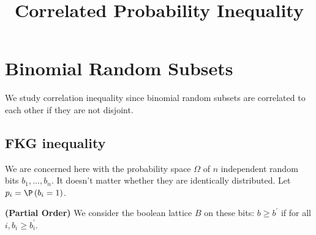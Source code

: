 \documentclass{article}
\title{Correlated Probability Inequality}
\newcommand{\bfs}[1]{\textbf{({#1})}}
\begin{document}
\maketitle



\section{Binomial Random Subsets}
We study correlation inequality since binomial random subsets are correlated to each other if they are not disjoint.
\subsection{FKG inequality}
We are concerned here with the probability space $\Omega$ of $n$ independent random  bits $b_{1}, \ldots, b_{n} .$ It doesn't matter whether they are identically distributed. Let $p_{i}=\P\left(b_{i}=1\right)$. 
\begin{defa}{\bfs{Partial Order}}\label{defa:po}
We consider the boolean lattice $B$ on these bits: $b \geq b^{\prime}$ if for all $i, b_{i} \geq b_{i}^{\prime} .$
\end{defa}
\end{document}

